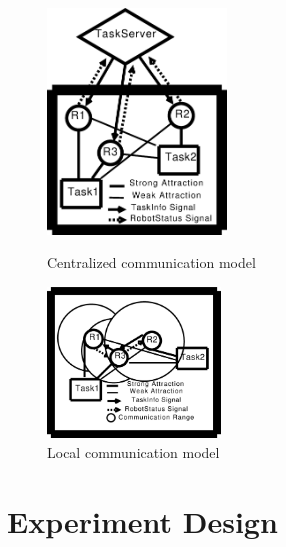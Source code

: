 \documentclass{llncs}
\begin{document}
\begin{figure}[ht]
\begin{minipage}[b]{0.55\linewidth}
\centering
\includegraphics[height=6cm, angle=0]{../dia-files/CentralizedComm.eps}
\caption{Centralized communication model}
\label{fig:1} %
\end{minipage}
\begin{minipage}[b]{0.45\linewidth}
\centering
\includegraphics[height=4cm, angle=0]{../dia-files/LocalComm.eps}
\caption{Local communication model}
\label{fig:2} %
\end{minipage}
\end{figure}

% 
\section{Experiment Design}
\label{sec:expt-design}
\end{document}
